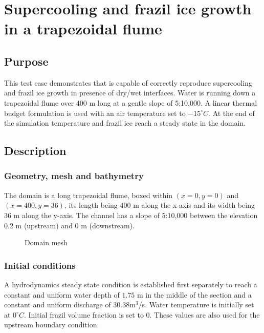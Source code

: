 \renewcommand{\labelitemi}{$\triangleright$}

\chapter{Supercooling and frazil ice growth in a trapezoidal flume}

\section{Purpose}
This test case demonstrates that \khione is capable of correctly reproduce
supercooling and frazil ice growth in presence of dry/wet interfaces.
Water is running down a trapezoidal flume over $400$ m long at a gentle slope of 5:10,000. A linear thermal budget formulation is used with an air temperature set to $-15^{\circ} C$. At the end of the simulation temperature and frazil ice reach a steady state in the domain.

\section{Description}

\subsection{Geometry, mesh and bathymetry}
The domain is a long trapezoidal flume, boxed within $(x=0, y=0)$ and $(x=400, y=36)$, its length being $400$ m along the x-axis and its width being $36$ m along the y-axis. The channel has a slope of 5:10,000 between the elevation $0.2$ m (upstream) and $0$ m (downstream).

\begin{figure}[H]
    \begin{center}
    \end{center}
    \caption{Domain mesh}
    \label{fig:mesh}
\end{figure}

\subsection{Initial conditions}

A hydrodynamics steady state condition is established first separately to reach a constant and uniform water depth of $1.75$ m in the middle of the section and a constant and uniform discharge of $30.38$m$^3$/s.
Water temperature is initially set at $0^\circ C$. Initial frazil volume fraction is set to $0$. These values are also used for the upstream boundary condition.

